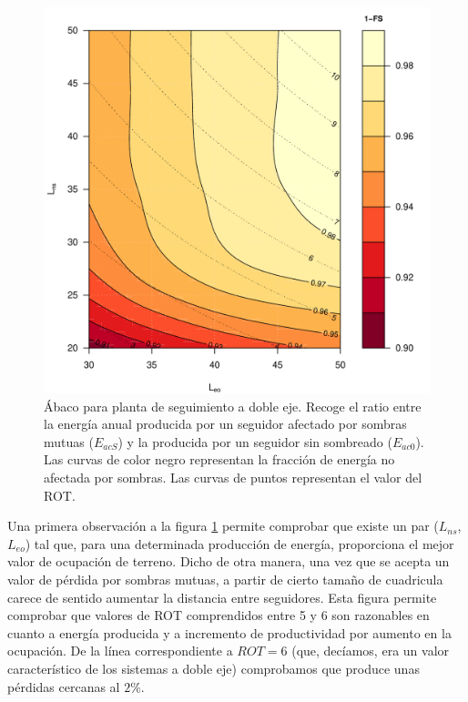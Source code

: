 \begin{figure}
\begin{centering}
\includegraphics[scale=0.75]{../figs/AbacoSombras}
\end{centering}

\caption[Ábaco para planta de seguimiento a doble eje.]{Ábaco para
  planta de seguimiento a doble eje\label{fig:Abaco-para-planta}. 
Recoge el ratio entre la energía anual producida por un seguidor afectado por sombras mutuas
($E_{acS}$) y la producida por un seguidor sin sombreado ($E_{ac0}$). Las curvas
de color negro representan la fracción de energía no afectada por sombras.
Las curvas de puntos representan el valor del ROT. }
\end{figure}


Una primera observación a la figura \ref{fig:Abaco-para-planta} permite
comprobar que existe un par ($L_{ns}$, $L_{eo}$) tal que, para una
determinada producción de energía, proporciona el mejor valor de ocupación
de terreno. Dicho de otra manera, una vez que se acepta un valor de
pérdida por sombras mutuas, a partir de cierto tamaño de cuadricula
carece de sentido aumentar la distancia entre seguidores. Esta figura
permite comprobar que valores de ROT comprendidos entre 5 y 6 son
razonables en cuanto a energía producida y a incremento de productividad
por aumento en la ocupación. De la línea correspondiente a $ROT=6$
(que, decíamos, era un valor característico de los sistemas a doble
eje) comprobamos que produce unas pérdidas cercanas al $2\%$. 

